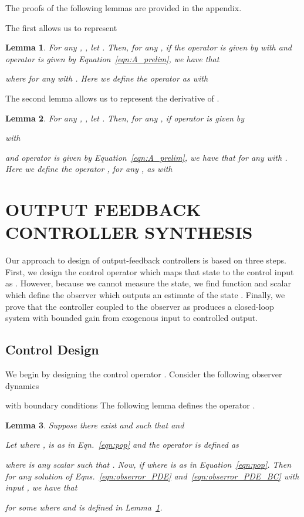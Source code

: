 \documentclass[US letter, 9 pt, conference]{ieeeconf}  \usepackage{setspace}
\newtheorem{lemma}{Lemma}
\begin{document}
The proofs of the following lemmas are provided in the appendix.

 The first allows us to represent 
\begin{lemma}\label{lem:dual_LOI}
For any , , let . Then, for any , if the operator  is given by
 with
 and operator  is given by Equation~\eqref{eqn:A_prelim}, we have that

where  for any  with . Here we define the operator  as
 with

\end{lemma}
The second lemma allows us to represent the derivative of .
\begin{lemma}\label{lem:primal_LOI}
For any , , let . Then, for any , if operator  is given by

 with

and operator  is given by Equation~\eqref{eqn:A_prelim},
we have that
 for any  with . Here we define the operator , for any , as
 with

\end{lemma}
\section{OUTPUT FEEDBACK CONTROLLER SYNTHESIS}\label{sec:control}

Our approach to design of output-feedback controllers is based on three steps. First, we design the control operator  which maps that state to the control input as . However, because we cannot measure the state, we find function  and scalar  which define the observer which outputs an estimate of the state . Finally, we prove that the controller coupled to the observer as  produces a closed-loop system with bounded  gain from exogenous input to controlled output.

\subsection{Control Design}
We begin by designing the control operator . Consider the following observer dynamics


with boundary conditions
 The following lemma defines the operator .
\begin{lemma}\label{lem:control}
Suppose there exist  and  such that
 and

Let  where ,  is as in Eqn.~\eqref{eqn:pop} and the operator  is defined as

where  is any scalar such that .
Now, if  where  is as in Equation~\eqref{eqn:pop}. Then for any solution  of Eqns.~\eqref{eqn:obserror_PDE} and~\eqref{eqn:obserror_PDE_BC} with input  , we have that

for some  where  and  is defined in Lemma~\ref{lem:dual_LOI}.
\end{lemma}
\end{document}
